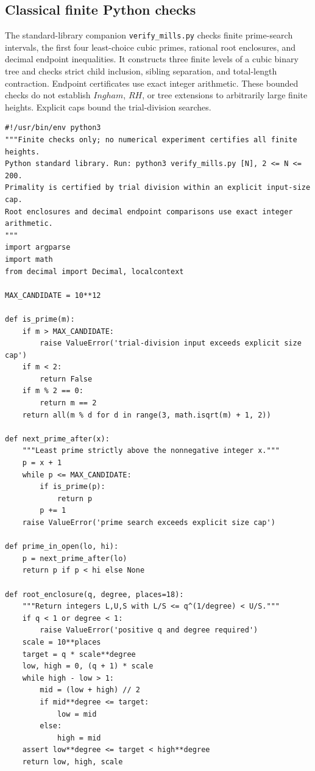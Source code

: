 \documentclass[11pt,reqno]{amsart}
\makeatletter
\theoremstyle{blueplain}
\newcounter{asser}
\newcommand{\defref}[1]{\hyperref[#1]{Definition~\ref*{#1}}}
\numberwithin{equation}{section}
\DeclareRobustCommand{\defref}[1]{%
  \hyperlink{def:#1}{\ensuremath{\csname PredicateName@#1\endcsname}}}
\def\defref#1{#1}%
\def\hyperlink#1#2{#2}}
\makeatother
\begin{document}
\subsection{Classical finite Python checks}\label{sec:scripts-python}
The standard-library companion \texttt{verify\_mills.py} checks finite
prime-search intervals, the first four least-choice cubic primes,
rational root enclosures, and decimal endpoint inequalities.
It constructs three finite levels of a cubic binary tree and checks
strict child inclusion, sibling separation, and total-length contraction.
Endpoint certificates use exact integer arithmetic.
These bounded checks do not establish \(\defref{Ingham}\),
\(\defref{RH}\), or tree extensions to arbitrarily large finite heights.
Explicit caps bound the trial-division searches.
\begin{lstlisting}[style=python,basicstyle=\ttfamily\scriptsize,numberstyle=\scriptsize]
#!/usr/bin/env python3
"""Finite checks only; no numerical experiment certifies all finite heights.
Python standard library. Run: python3 verify_mills.py [N], 2 <= N <= 200.
Primality is certified by trial division within an explicit input-size cap.
Root enclosures and decimal endpoint comparisons use exact integer arithmetic.
"""
import argparse
import math
from decimal import Decimal, localcontext

MAX_CANDIDATE = 10**12

def is_prime(m):
    if m > MAX_CANDIDATE:
        raise ValueError('trial-division input exceeds explicit size cap')
    if m < 2:
        return False
    if m % 2 == 0:
        return m == 2
    return all(m % d for d in range(3, math.isqrt(m) + 1, 2))

def next_prime_after(x):
    """Least prime strictly above the nonnegative integer x."""
    p = x + 1
    while p <= MAX_CANDIDATE:
        if is_prime(p):
            return p
        p += 1
    raise ValueError('prime search exceeds explicit size cap')

def prime_in_open(lo, hi):
    p = next_prime_after(lo)
    return p if p < hi else None

def root_enclosure(q, degree, places=18):
    """Return integers L,U,S with L/S <= q^(1/degree) < U/S."""
    if q < 1 or degree < 1:
        raise ValueError('positive q and degree required')
    scale = 10**places
    target = q * scale**degree
    low, high = 0, (q + 1) * scale
    while high - low > 1:
        mid = (low + high) // 2
        if mid**degree <= target:
            low = mid
        else:
            high = mid
    assert low**degree <= target < high**degree
    return low, high, scale


\end{lstlisting}
\end{document}
